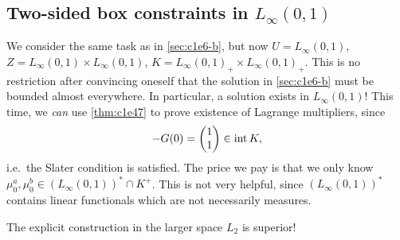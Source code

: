 \documentclass[../skript.tex]{subfiles}
\begin{document}
\subsection{Two-sided box constraints in \texorpdfstring{$L_\infty(0, 1)$}{L∞(0, 1)}} %
\label{sec:c1e6-c}
We consider the same task as in \cref{sec:c1e6-b}, but now $U = L_\infty(0, 1)$, $Z = L_\infty(0, 1) \times L_\infty(0, 1)$, $K = L_\infty(0, 1)_+ \times L_\infty(0, 1)_+$.
This is no restriction after convincing oneself that the solution in \cref{sec:c1e6-b} must be bounded almost everywhere.
In particular, a solution exists in $L_\infty(0, 1)$!
This time, we \emph{can} use \cref{thm:c1e47} to prove existence of Lagrange multipliers, since
\[
	-G(0) = \begin{pmatrix}
	1 \\ 1
	\end{pmatrix} \in \operatorname{int} K,
\]
i.e.\ the Slater condition is satisfied.
The price we pay is that we only know $\mu_0^a, \mu_0^b \in (L_\infty(0, 1))^* \cap K^+$. This is not very helpful, since $(L_\infty(0, 1))^*$ contains linear functionals which are not necessarily measures.

The explicit construction in the larger space $L_2$ is superior!
\end{document}
